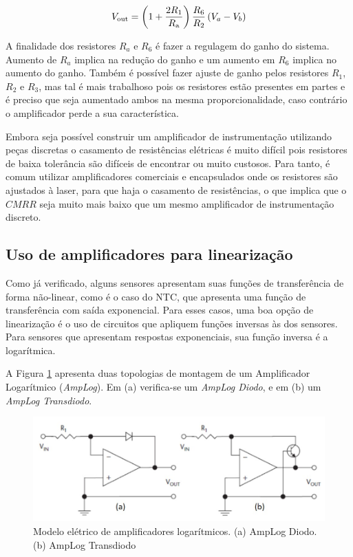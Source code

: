 \documentclass[a4paper]{instrumentacao}
\begin{document}
\begin{equation}
	V_\mathrm{out} = \left (1 + {2 R_1 \over R_\mathrm{a}} \right ) {R_6 \over R_2} \left(V_a - V_b\right)
\end{equation}

A finalidade dos resistores $R_a$ e $R_6$ é fazer a regulagem do ganho do sistema. Aumento de $R_a$ implica na redução do ganho e um aumento em $R_6$ implica no aumento do ganho. Também é possível fazer ajuste de ganho pelos resistores $R_1$, $R_2$ e $R_3$, mas tal é mais trabalhoso pois os resistores estão presentes em partes e é preciso que seja aumentado ambos na mesma proporcionalidade, caso contrário o amplificador perde a sua característica.

Embora seja possível construir um amplificador de instrumentação utilizando peças discretas o casamento de resistências elétricas é muito difícil pois resistores de baixa tolerância são difíceis de encontrar ou muito custosos. Para tanto, é comum utilizar amplificadores comerciais e encapsulados onde os resistores são ajustados à laser\cite{wikipedia-ia}, para que haja o casamento de resistências, o que implica que o $CMRR$ seja muito mais baixo que um mesmo amplificador de instrumentação discreto.

\subsection{Uso de amplificadores para linearização}

Como já verificado, alguns sensores apresentam suas funções de transferência de forma não-linear, como é o caso do NTC, que apresenta uma função de transferência com saída exponencial. Para esses casos, uma boa opção de linearização é o uso de circuitos que apliquem funções inversas às dos sensores. Para sensores que apresentam respostas exponenciais, sua função inversa é a logarítmica.

A Figura \ref{fig:amplificador-logaritmico} apresenta duas topologias de montagem de um Amplificador Logarítmico (\textit{AmpLog}). Em (a) verifica-se um \textit{AmpLog Diodo}, e em (b) um \textit{AmpLog Transdiodo}. 

\begin{figure}[H]
\center
\includegraphics[width=\textwidth]{amp_log.jpg}
\caption{Modelo elétrico de amplificadores logarítmicos. (a) AmpLog Diodo. (b) AmpLog Transdiodo}
\label{fig:amplificador-logaritmico}
\end{figure}
\end{document}
